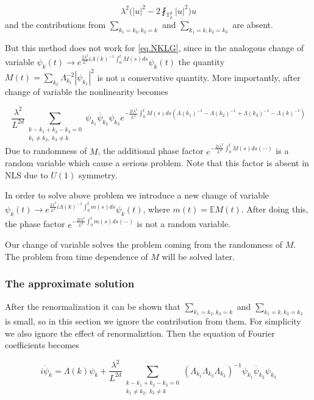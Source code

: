 \begin{equation}
    \lambda^2\bigg(|u|^2-2\fint_{\mathbb{T}_L^d}|u|^2\bigg)u
\end{equation}
and the contributions from $\sum_{k_1=k_2,k_3=k}$ and $\sum_{k_1=k,k_2=k_3}$ are absent.

But this method does not work for \eqref{eq.NKLG}, since in the analogous change of variable $\psi_k(t)\rightarrow e^{\frac{2\lambda^2}{L^{d}} i \Lambda(k)^{-1}\int^t_{0}M(s) ds}  \psi_k(t)$ the quantity $M(t)=\sum_{k_1}\Lambda_{k_1}^{-2}|\psi_{k_1}|^2$ is not a conservative quantity. More importantly, after change of variable the nonlinearity becomes

\begin{equation}
\frac{\lambda^2}{L^{2d}} \sum\limits_{\substack{k - k_1 + k_2 -k_3 = 0 \\  k_1\ne k_2,\ k_3 \ne k}} \psi_{k_1}\overline{\psi}_{k_2}  \psi_{k_3} e^{- \frac{2i\lambda^2}{L^{d}} \int^t_{0}M(s) ds\left(\Lambda(k_1)^{-1}-\Lambda(k_2)^{-1}+\Lambda(k_3)^{-1}-\Lambda(k)^{-1}\right)} 
\end{equation}
Due to randomness of $M$, the additional phase factor $e^{- \frac{2i\lambda^2}{L^{d}} \int^t_{0}M(s) ds(\cdots)}$ is a random variable which cause a serious problem. Note that this factor is absent in NLS due to $U(1)$ symmetry. 

In order to solve above problem we introduce a new change of variable $\psi_k(t)\rightarrow e^{\frac{2\lambda^2}{L^{d}} i \Lambda(k)^{-1}\int^t_{0}m(s) ds}  \psi_k(t)$, where $m(t)=\mathbb{E}M(t)$. After doing this, the phase factor $e^{- \frac{2i\lambda^2}{L^{d}} \int^t_{0}m(s) ds(\cdots)}$ is not a random variable. 

Our change of variable solves the problem coming from the randomness of $M$. The problem from time dependence of $M$ will be solved later.

\subsubsection{The approximate solution}\label{sec.appsol} After the renormalization it can be shown that  $\sum_{k_1=k_2,k_3=k}$ and $\sum_{k_1=k,k_2=k_3}$ is small, so in this section we ignore the contribution from them. For simplicity we also ignore the effect of renormaliztion. Then the equation of Fourier coefficients becomes

\begin{equation}\label{eq.Fourierintro}
    i \dot{\psi}_{k} =  \Lambda(k) \psi_k+\frac{\lambda^2}{L^{2d}} \sum\limits_{\substack{k - k_1 + k_2 -k_3 = 0 \\  k_1\ne k_2,\ k_3 \ne k}} (\Lambda_{k_1}\Lambda_{k_2}\Lambda_{k_3})^{-1}\psi_{k_1}\overline{\psi}_{k_2}  \psi_{k_3}
\end{equation}


